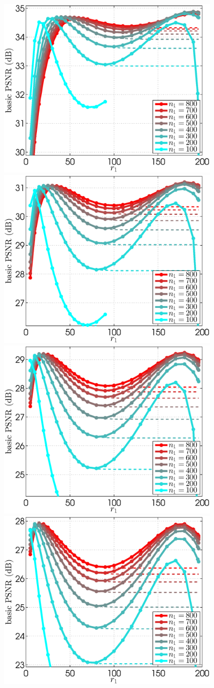 \documentclass[10pt, journal, twocolumn, final, a4paper]{IEEEtran}
\begin{document}
\begin{figure}[htpb!]
	\begin{center}
		\includegraphics[width=.25\textwidth]{figs/params_tables/bpsnr_r1-np1-curves_s10_average_mono_neg-vs-pos-weights.eps}%
		\includegraphics[width=.25\textwidth]{figs/params_tables/bpsnr_r1-np1-curves_s20_average_mono_neg-vs-pos-weights.eps}%
		\includegraphics[width=.25\textwidth]{figs/params_tables/bpsnr_r1-np1-curves_s30_average_mono_neg-vs-pos-weights.eps}%
		\includegraphics[width=.25\textwidth]{figs/params_tables/bpsnr_r1-np1-curves_s40_average_mono_neg-vs-pos-weights.eps}\\


\end{center}
\end{figure}
\end{document}
